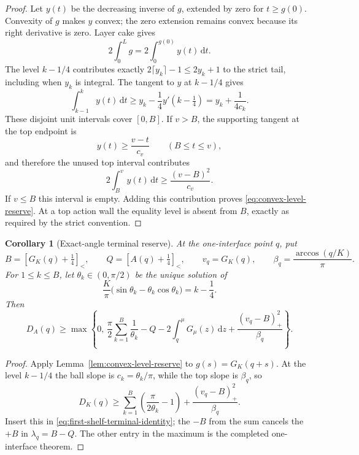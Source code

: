 \documentclass[11pt]{article}
\newtheorem{corollary}[theorem]{Corollary}
\theoremstyle{remark}
\newcommand{\sbr}[1]{[#1]_{<}}
\newcommand{\dd}{\,\mathrm d}
\begin{document}
\begin{proof}
Let $y(t)$ be the decreasing inverse of $g$, extended by zero for
$t\geq g(0)$.  Convexity of $g$ makes $y$ convex; the zero extension
remains convex because its right derivative is zero.  Layer cake gives
\[
 2\int_0^Lg=2\int_0^{g(0)}y(t)\dd t.
\]
The level $k-1/4$ contributes exactly
$2\lceil y_k\rceil-1\leq2y_k+1$ to the strict tail, including when
$y_k$ is integral.  The tangent to $y$ at $k-1/4$ gives
\[
 \int_{k-1}^{k}y(t)\dd t
 \geq y_k-\frac14y'(k-\tfrac14)
 =y_k+\frac1{4c_k}.
\]
These disjoint unit intervals cover $[0,B]$.  If $v>B$, the supporting
tangent at the top endpoint is
\[
 y(t)\geq\frac{v-t}{c_v}\qquad(B\leq t\leq v),
\]
and therefore the unused top interval contributes
\[
 2\int_B^vy(t)\dd t\geq\frac{(v-B)^2}{c_v}.
\]
If $v\leq B$ this interval is empty.  Adding this contribution proves
\eqref{eq:convex-level-reserve}.  At a top action wall the equality level
is absent from $B$, exactly as required by the strict convention.
\end{proof}

\begin{corollary}[Exact-angle terminal reserve]
\label{cor:exact-angle-terminal-reserve}
At the one-interface point $q$, put
\[
 B=\sbr{G_K(q)+\tfrac14},
 \qquad Q=\sbr{A(q)+\tfrac14},
 \qquad v_q=G_K(q),
 \qquad \beta_q=\frac{\arccos(q/K)}\pi.
\]
For $1\leq k\leq B$, let $\theta_k\in(0,\pi/2)$ be the unique solution
of
\[
 \frac K\pi\bigl(\sin\theta_k-\theta_k\cos\theta_k\bigr)
 =k-\frac14.
\]
Then
\begin{equation}
 \boxed{
 D_A(q)\geq
 \max\left\{0,\,
 \frac\pi2\sum_{k=1}^{B}\frac1{\theta_k}
 -Q-2\int_q^\mu G_\mu(z)\dd z
 +\frac{(v_q-B)_+^2}{\beta_q}
 \right\}.}
 \label{eq:exact-angle-terminal-reserve}
\end{equation}
\end{corollary}

\begin{proof}
Apply Lemma~\ref{lem:convex-level-reserve} to
$g(s)=G_K(q+s)$.  At the level $k-1/4$ the ball slope is
$c_k=\theta_k/\pi$, while the top slope is $\beta_q$, so
\[
 D_K(q)\geq\sum_{k=1}^{B}
 \left(\frac\pi{2\theta_k}-1\right)
 +\frac{(v_q-B)_+^2}{\beta_q}.
\]
Insert this in \eqref{eq:first-shelf-terminal-identity}; the $-B$ from
the sum cancels the $+B$ in $\lambda_q=B-Q$.  The other entry in the
maximum is the completed one-interface theorem.
\end{proof}
\end{document}
